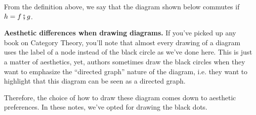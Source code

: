 From the definition above, we say that the diagram shown below commutes
if $h = f \fatsemi g$.

\begin{shaded}
	\textbf{Aesthetic differences when drawing diagrams.}
	If you've picked up any book on Category Theory, you'll note that almost every
	drawing of a diagram uses the label of a node instead of the black circle
	as we've done here. This is just a matter of aesthetics, yet, authors
	sometimes draw the black circles when they want to emphasize the
	``directed graph'' nature of the diagram, i.e. they want to highlight
	that this diagram can be seen as a directed graph.

	Therefore, the choice of how to draw these diagram comes down to
	aesthetic preferences. In these notes, we've opted for drawing the
	black dots.
\end{shaded}

